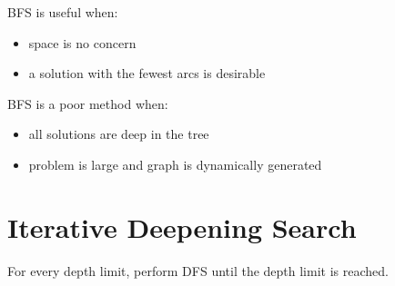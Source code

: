\documentclass[11pt]{article}
\begin{document}
BFS is useful when:
\begin{itemize}
\item space is no concern
\item a solution with the fewest arcs is desirable
\end{itemize}

BFS is a poor method when:
\begin{itemize}
\item all solutions are deep in the tree
\item problem is large and graph is dynamically generated
\end{itemize}
\section{Iterative Deepening Search}
\label{sec:org379264a}
For every depth limit, perform DFS until the depth limit is reached.
\end{document}

